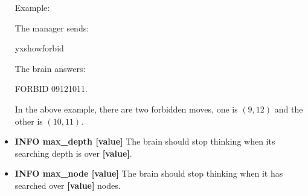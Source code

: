 \documentclass[a4paper,12pt]{article}
\begin{document}
\begin{itemize}
Example: 

The manager sends:

\fbox
{
yxshowforbid
}

The brain answers:

\fbox
{
FORBID 09121011.
}

In the above example, there are two forbidden moves, one is $(9,12)$ and the other is $(10,11)$.

\item \textbf{INFO max\_depth [value]}
The brain should stop thinking when its searching depth is over \textbf{[value]}.
\item \textbf{INFO max\_node [value]}
The brain should stop thinking when it has searched over \textbf{[value]} nodes. %

\end{itemize}



\end{document}

